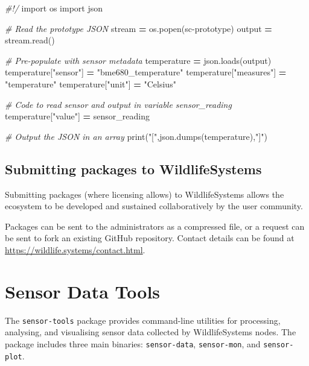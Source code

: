 \documentclass[
]{book}
\newenvironment{Shaded}{\begin{snugshade}}{\end{snugshade}}
\newcommand{\BuiltInTok}[1]{#1}
\newcommand{\CommentTok}[1]{\textcolor[rgb]{0.56,0.35,0.01}{\textit{#1}}}
\newcommand{\ImportTok}[1]{#1}
\newcommand{\NormalTok}[1]{#1}
\newcommand{\OperatorTok}[1]{\textcolor[rgb]{0.81,0.36,0.00}{\textbf{#1}}}
\newcommand{\StringTok}[1]{\textcolor[rgb]{0.31,0.60,0.02}{#1}}
\begin{document}
\begin{Shaded}
\begin{Highlighting}[]
\CommentTok{\#!/}
\ImportTok{import}\NormalTok{ os}
\ImportTok{import}\NormalTok{ json}

\CommentTok{\# Read the prototype JSON}
\NormalTok{stream }\OperatorTok{=}\NormalTok{ os.popen(}\StringTok{\textquotesingle{}sc{-}prototype\textquotesingle{}}\NormalTok{)}
\NormalTok{output }\OperatorTok{=}\NormalTok{ stream.read()}

\CommentTok{\# Pre{-}populate with sensor metadata}
\NormalTok{temperature }\OperatorTok{=}\NormalTok{ json.loads(output)}
\NormalTok{temperature[}\StringTok{"sensor"}\NormalTok{] }\OperatorTok{=} \StringTok{"bme680\_temperature"}
\NormalTok{temperature[}\StringTok{"measures"}\NormalTok{] }\OperatorTok{=} \StringTok{"temperature"}
\NormalTok{temperature[}\StringTok{"unit"}\NormalTok{] }\OperatorTok{=} \StringTok{"Celsius"}

\CommentTok{\# Code to read sensor and output in variable \textasciigrave{}sensor\_reading\textasciigrave{}}
\NormalTok{temperature[}\StringTok{"value"}\NormalTok{] }\OperatorTok{=}\NormalTok{ sensor\_reading}

\CommentTok{\# Output the JSON in an array}
\BuiltInTok{print}\NormalTok{(}\StringTok{"["}\NormalTok{,json.dumps(temperature),}\StringTok{"]"}\NormalTok{)}
\end{Highlighting}
\end{Shaded}

\section{Submitting packages to WildlifeSystems}\label{submitting-packages-to-wildlifesystems}

Submitting packages (where licensing allows) to WildlifeSystems allows the ecosystem to be developed and sustained collaboratively by the user community.

Packages can be sent to the administrators as a compressed file, or a request can be sent to fork an existing GitHub repository. Contact details can be found at \url{https://wildlife.systems/contact.html}.

\chapter{Sensor Data Tools}\label{sensor-data-tools}

The \texttt{sensor-tools} package provides command-line utilities for processing, analysing, and visualising sensor data collected by WildlifeSystems nodes. The package includes three main binaries: \texttt{sensor-data}, \texttt{sensor-mon}, and \texttt{sensor-plot}.
\end{document}
